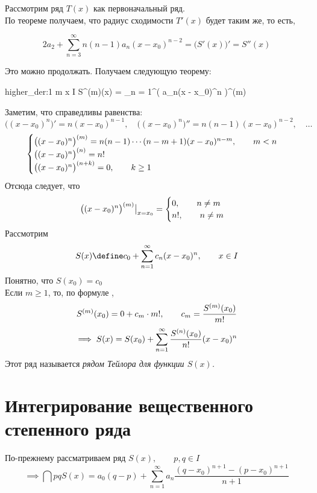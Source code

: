 Рассмотрим ряд $ T(x) $ как первоначальный ряд. \\
По теореме получаем, что радиус сходимости $ T'(x) $ будет таким же, то есть,

\begin{implication}
	$$ 2a_2 + \sum_{n = 3}^\infty n(n - 1)a_n(x - x_0)^{n - 2} = \bigg( S'(x) \bigg)' = S''(x) $$
\end{implication}

Это можно продолжать. Получаем следующую теорему:

\begin{theorem}
	\begin{equ}{higher_der:1}
		\forall m \quad \forall x \in I \quad \exist S^{(m)}(x) = \sum_{n = 1}^\infty \bigg( a_n(x - x_0)^n \bigg)^{(m)}
	\end{equ}
\end{theorem}

Заметим, что справедливы равенства:
$$ \big( (x - x_0)^n \big)' = n(x - x_0)^{n - 1}, \quad \big( (x - x_0)^n \big)'' = n(n - 1)(x - x_0)^{n - 2}, \quad \dots $$
$$
\begin{cases}
	\nder[m]{\big( (x - x_0)^n \big)} = n(n - 1)\cdots(n - m + 1)(x - x_0)^{n - m}, \qquad m < n \\
	\nder{\big( (x - x_0)^n \big)} = n! \\
	\nder[n + k]{\big( (x - x_0)^n \big)} = 0, \qquad k \ge 1
\end{cases} $$
Отсюда следует, что
$$ \nder[m]{\big( (x - x_0)^n \big)}\clamp{x = x_0} =
\begin{cases}
	0, \qquad n \ne m \\
	n!, \qquad n \ne m
\end{cases} $$
Рассмотрим
$$ S(x) \define c_0 + \sum_{n = 1}^\infty c_n(x - x_0)^n, \qquad x \in I $$
Понятно, что $ S(x_0) = c_0 $ \\
Если $ m \ge 1 $, то, по формуле ,
$$ \nder[m]S(x_0) = 0 + c_m \cdot m!, \qquad c_m = \frac{\nder[m]S(x_0)}{m!} $$
$$ \implies S(x) = S(x_0) + \sum_{n = 1}^\infty \frac{\nder S(x_0)}{n!}(x - x_0)^n $$
Этот ряд называется \it{рядом Тейлора} для функции $ S(x) $.

\section{Интегрирование вещественного степенного ряда}

\begin{theorem}
	По-прежнему рассматриваем ряд $ S(x), \qquad p, q \in I $ \nimp[(не обязательно $ p < q $)]
	$$ \implies \dint pq{S(x)} = a_0(q - p) + \sum_{n = 1}^\infty a_n \frac{(q - x_0)^{n + 1} - (p - x_0)^{n + 1}}{n + 1} $$
\end{theorem}

